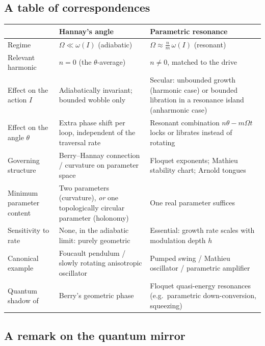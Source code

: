 \documentclass[11pt]{book}
\begin{document}
\subsection{A table of correspondences}

\begin{center}
\renewcommand{\arraystretch}{1.3}
\begin{tabular}{@{}p{3.1cm}p{5.7cm}p{5.7cm}@{}}
\toprule
& \textbf{Hannay's angle} & \textbf{Parametric resonance} \\
\midrule
Regime & $\Omega \ll \omega(I)$ (adiabatic) & $\Omega \approx \tfrac{n}{m}\,\omega(I)$ (resonant) \\
Relevant harmonic & $n=0$ (the $\theta$-average) & $n\neq 0$, matched to the drive \\
Effect on the action $I$ & Adiabatically invariant; bounded wobble only & Secular: unbounded growth
(harmonic case) or bounded libration in a resonance island (anharmonic case) \\
Effect on the angle $\theta$ & Extra phase shift per loop, independent of the traversal rate &
Resonant combination $n\theta-m\Omega t$ locks or librates instead of rotating \\
Governing structure & Berry--Hannay connection / curvature on parameter space &
Floquet exponents; Mathieu stability chart; Arnold tongues \\
Minimum parameter content & Two parameters (curvature), \emph{or} one topologically circular
parameter (holonomy) & One real parameter suffices \\
Sensitivity to rate & None, in the adiabatic limit: purely geometric & Essential: growth rate scales
with modulation depth $h$ \\
Canonical example & Foucault pendulum / slowly rotating anisotropic oscillator & Pumped swing /
Mathieu oscillator / parametric amplifier \\
Quantum shadow of & Berry's geometric phase & Floquet quasi-energy resonances (e.g.\ parametric
down-conversion, squeezing) \\
\bottomrule
\end{tabular}
\end{center}

\subsection{A remark on the quantum mirror}
\end{document}
